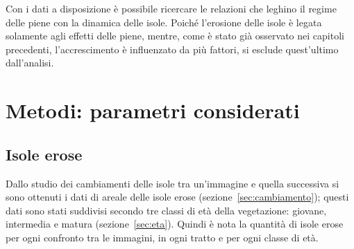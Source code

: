 Con i dati a disposizione è possibile ricercare le relazioni che leghino il regime delle piene con la dinamica delle isole.
Poiché l'erosione delle isole è legata solamente agli effetti delle piene, mentre, come è stato già osservato nei capitoli precedenti, l'accrescimento è influenzato da più fattori, si esclude quest'ultimo dall'analisi.

\section{Metodi: parametri considerati}

\subsection{Isole erose}
Dallo studio dei cambiamenti delle isole tra un'immagine e quella successiva si sono ottenuti i dati di areale delle isole erose (sezione~\ref{sec:cambiamento});
questi dati sono stati suddivisi secondo tre classi di età della vegetazione: giovane, intermedia e matura (sezione~\ref{sec:eta}).
Quindi è nota la quantità di isole erose per ogni confronto tra le immagini, in ogni tratto e per ogni classe di età.

